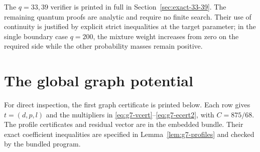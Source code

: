 \documentclass[11pt,a4paper]{article}
\theoremstyle{definition}\newtheorem{definition}[theorem]{Definition}
\theoremstyle{remark}\newtheorem{remark}[theorem]{Remark}
\begin{document}
The $q=33,39$ verifier is printed in full in
Section~\ref{sec:exact-33-39}. The remaining quantum proofs are analytic
and require no finite search. Their use of continuity is justified by
explicit strict inequalities at the target parameter; in the single
boundary case $q=200$, the mixture weight increases from zero on the
required side while the other probability masses remain positive.

\section{The global graph potential}
For direct inspection, the first graph certificate is printed below.
Each row gives $t=(d,p,l)$ and the multipliers in
\eqref{eq:g7-vcert}--\eqref{eq:g7-ecert2}, with $C=875/68$.
The profile certificates and residual vector are in the embedded
bundle. Their exact coefficient inequalities are specified in
Lemma~\ref{lem:g7-profiles} and checked by the bundled program.
\end{document}

